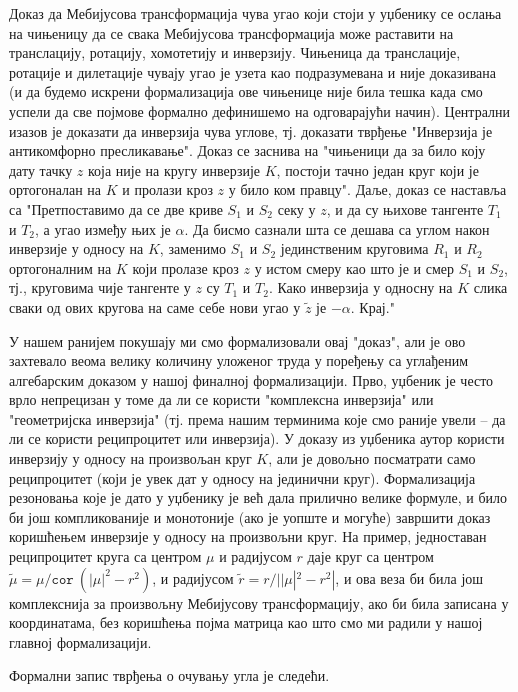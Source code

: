 Доказ да Мебијусова трансформација чува угао који стоји у уџбенику
\cite{needham} се ослања на чињеницу да се свака Мебијусова
трансформација може раставити на транслацију, ротацију, хомотетију и
инверзију. Чињеница да транслације, ротације и дилетације чувају угао
је узета као подразумевана и није доказивана (и да будемо искрени
формализација ове чињенице није била тешка када смо успели да све
појмове формално дефинишемо на одговарајући начин). Централни изазов
је доказати да инверзија чува углове, тј. доказати тврђење "Инверзија
је антикомфорно пресликавање".  Доказ се заснива на "чињеници да за
било коју дату тачку $z$ која није на кругу инверзије $K$, постоји
тачно један круг који је ортогоналан на $K$ и пролази кроз $z$ у било
ком правцу". Даље, доказ се наставља са "Претпоставимо да се две криве
$S_1$ и $S_2$ секу у $z$, и да су њихове тангенте $T_1$ и $T_2$, а
угао између њих је $\alpha$. Да бисмо сазнали шта се дешава са углом
након инверзије у односу на $K$, заменимо $S_1$ и $S_2$ јединственим
круговима $R_1$ и $R_2$ ортогоналним на $K$ који пролазе кроз $z$ у
истом смеру као што је и смер $S_1$ и $S_2$, тј., круговима чије
тангенте у $z$ су $T_1$ и $T_2$. Како инверзија у односну на $K$ слика
сваки од ових кругова на саме себе нови угао у $\tilde{z}$ је
$-\alpha$. Крај."

У нашем ранијем покушају ми смо формализовали овај "доказ", али је ово
захтевало веома велику количину уложеног труда у поређењу са углађеним
алгебарским доказом у нашој финалној формализацији.  Прво, уџбеник је
често врло непрецизан у томе да ли се користи "комплексна инверзија"
или "геометријска инверзија" (тј. према нашим терминима које смо
раније увели -- да ли се користи реципроцитет или инверзија). У доказу
из уџбеника аутор користи инверзију у односу на произвољан круг $K$,
али је довољно посматрати само реципроцитет (који је увек дат у односу
на јединични круг). Формализација резоновања које је дато у уџбенику
је већ дала прилично велике формуле, и било би још компликованије и
монотоније (ако је уопште и могуће) завршити доказ коришћењем
инверзије у односу на произвољни круг. На пример, једноставан
реципроцитет круга са центром $\mu$ и радијусом $r$ даје круг са
центром $\tilde{\mu} = \mu / \mathtt{cor}\ (|\mu|^2 - r^2)$, и
радијусом $\tilde{r} = r / ||\mu|^2 - r^2|$, и ова веза би била још
комплекснија за произвољну Мебијусову трансформацију, ако би била
записана у координатама, без коришћења појма матрица као што смо ми
радили у нашој главној формализацији.

Формални запис тврђења о очувању угла је следећи.

